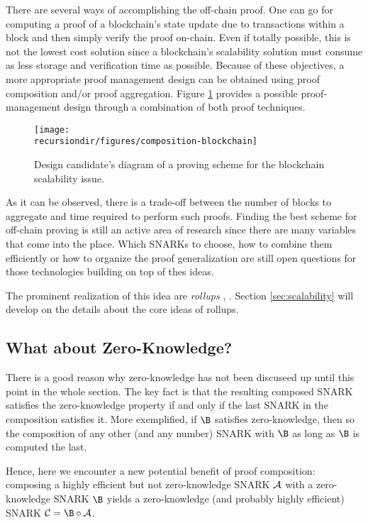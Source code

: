 There are several ways of accomplishing the off-chain proof. One can go for computing a proof of a blockchain's state update due to transactions within a block and then simply verify the proof on-chain. Even if totally possible, this is not the lowest cost solution since a blockchain's scalability solution must consume as less storage and verification time as possible. Because of these objectives, a more appropriate proof management design can be obtained using proof composition and/or proof aggregation.
Figure \ref{fig:composition-blockchain} provides a possible proof-management design through a combination of both proof techniques.
\begin{figure}[H]
	\centering
	\texttt{[image: \\recursiondir/figures/composition-blockchain]}
	\caption{Design candidate's diagram of a proving scheme for the blockchain scalability issue.}
	\label{fig:composition-blockchain}
\end{figure}
As it can be observed, there is a trade-off between the number of blocks to aggregate and time required to perform such proofs. Finding the best scheme for off-chain proving is still an active area of research since there are many variables that come into the place. Which SNARKs to choose, how to combine them efficiently or how to organize the proof generalization are still open questions for those technologies building on top of thes ideas.

The prominent realization of this idea are \textit{rollups} \cite{Thibault2022}, \cite{Lavaur2022}. Section \ref{sec:scalability} will develop on the details about the core ideas of rollups.



\subsection{What about Zero-Knowledge?}

There is a good reason why zero-knowledge has not been discuseed up until this point in the whole section. The key fact is that the resulting composed SNARK satisfies the zero-knowledge property if and only if the last SNARK in the composition satisfies it. More exemplified, if $\B$ satisfies zero-knowledge, then so the composition of any other (and any number) SNARK with $\B$ as long as $\B$ is computed the last.

Hence, here we encounter a new potential benefit of proof composition: composing a highly efficient but not zero-knowledge SNARK $\mathcal{A}$ with a zero-knowledge SNARK $\B$ yields a zero-knowledge (and probably highly efficient) SNARK $\C = \B \circ \A$. 

\fi
